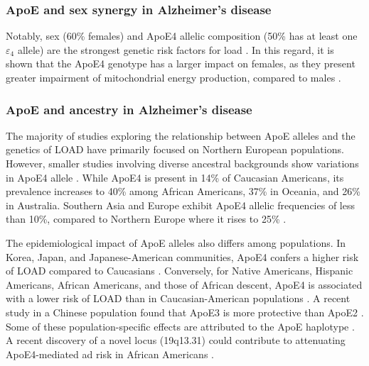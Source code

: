 \documentclass{amsart}
\begin{document}
\subsubsection{ApoE and sex synergy in Alzheimer's disease}
Notably, sex (60\% females) and ApoE4 allelic composition (50\% has at least one $\varepsilon_4$ allele) are the strongest genetic risk factors for \acrshort{load} \cite{Arnold2020SexMetabolome}. In this regard, it is shown that the ApoE4 genotype has a larger impact on females, as they present greater impairment of mitochondrial energy production, compared to males \cite{Arnold2020SexMetabolome, Yassine2020APOEDisease}.

\subsubsection{ApoE and ancestry in Alzheimer's disease}
The majority of studies exploring the relationship between ApoE alleles and the genetics of LOAD have primarily focused on Northern European populations\cite{Yang2023ApolipoproteinDisease}. However, smaller studies involving diverse ancestral backgrounds show variations in ApoE4 allele \cite{Yang2023ApolipoproteinDisease}. While ApoE4 is present in 14\% of Caucasian Americans, its prevalence increases to 40\% among African Americans, 37\% in Oceania, and 26\% in Australia. Southern Asia and Europe exhibit ApoE4 allelic frequencies of less than 10\%, compared to Northern Europe where it rises to 25\% \cite{Belloy2019AForward, Egert2012ApoEFactors, Eisenberg2010WorldwideHistory, Logue2011AAmericans}.

The epidemiological impact of ApoE alleles also differs among populations. In Korea, Japan, and Japanese-American communities, ApoE4 confers a higher risk of LOAD compared to Caucasians \cite{Farrer1997EffectsMeta-analysis}. Conversely, for Native Americans, Hispanic Americans, African Americans, and those of African descent, ApoE4 is associated with a lower risk of LOAD than in Caucasian-American populations \cite{Farrer1997EffectsMeta-analysis, Blue2019LocalHispanics, Suchy-Dicey2022APOEStudy, Rajabli2018AncestralPopulations, Naslavsky2022GlobalSample}. A recent study in a Chinese population found that ApoE3 is more protective than ApoE2 \cite{Chen2011ApolipoproteinDisease}. Some of these population-specific effects are attributed to the ApoE haplotype \cite{Blue2019LocalHispanics, Rajabli2018AncestralPopulations}. A recent discovery of a novel locus (19q13.31) could contribute to attenuating ApoE4-mediated \acrshort{ad} risk in African Americans \cite{Rajabli2022AAncestry}.
\end{document}

